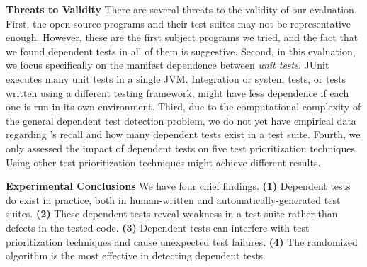 
\tinyrelax

\noindent \textbf{Threats to Validity}
There are several threats to the validity of our evaluation.
First, the \subjnum open-source
programs and their test suites may not be
representative enough. 
However, these are the first \subjnum subject programs
we tried, and the fact that we found dependent tests
in all of them is suggestive.
Second, in this evaluation, we focus specifically on
the {manifest dependence} between \textit{unit tests}.
JUnit executes many unit tests in a single JVM\@.
Integration or system tests, or tests written using a different testing
framework, might have less dependence if
each one is run in its own environment.
Third, due to the computational complexity of the general dependent test
detection problem, we do not yet have
empirical data regarding \ourtool's recall and how many dependent
tests exist in a test suite. 
Fourth, we only assessed the
impact of dependent tests on five test prioritization
techniques.
Using other test prioritization techniques
might achieve different results. 


\tinyrelax

\noindent \textbf{Experimental Conclusions}
We have four chief findings. \textbf{(1)}
Dependent tests do exist in practice, both in
human-written and automatically-generated test suites.
\textbf{(2)} These dependent tests reveal weakness
in a test suite rather than defects in the tested code.
\textbf{(3)} Dependent tests can interfere with
test prioritization techniques and cause unexpected test failures.
\textbf{(4)} 
The randomized algorithm is the most effective in
detecting dependent tests.


